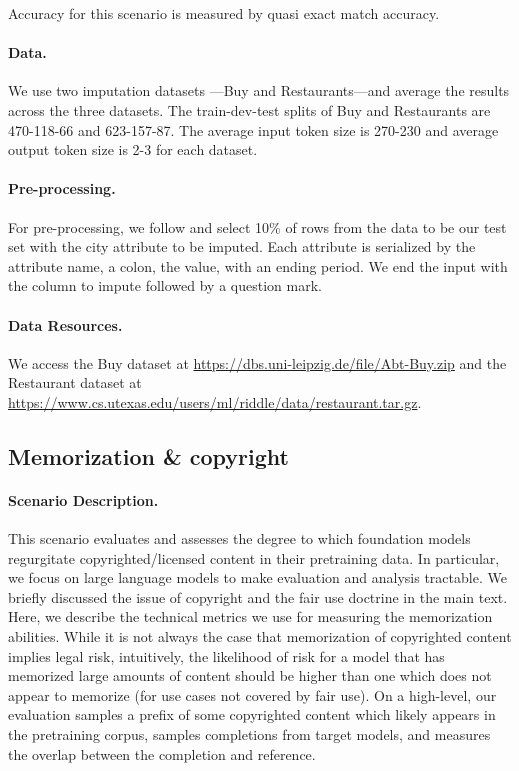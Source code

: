 Accuracy for this scenario is measured by quasi exact match accuracy.

\paragraph{Data.}
We use two imputation datasets \citep{mei2021capturing}---Buy and Restaurants---and average the results across the three datasets. The train-dev-test splits of Buy and Restaurants are 470-118-66 and 623-157-87. The average input token size is 270-230 and average output token size is 2-3 for each dataset.

\paragraph{Pre-processing.}
For pre-processing, we follow \citet{mei2021capturing} and select 10\% of rows from the data to be our test set with the city attribute to be imputed. Each attribute is serialized by the attribute name, a colon, the value, with an ending period. We end the input with the column to impute followed by a question mark.

\paragraph{Data Resources.}
We access the Buy dataset at \url{https://dbs.uni-leipzig.de/file/Abt-Buy.zip} and the Restaurant dataset at \url{https://www.cs.utexas.edu/users/ml/riddle/data/restaurant.tar.gz}.

\subsection{Memorization \& copyright}
\label{app:component-copyright}

\paragraph{Scenario Description.}
This scenario evaluates and assesses the degree to which foundation models regurgitate copyrighted/licensed content in their pretraining data.
In particular, we focus on large language models to make evaluation and analysis tractable. 
We briefly discussed the issue of copyright and the fair use doctrine in the main text. 
Here, we describe the technical metrics we use for measuring the memorization abilities. 
While it is not always the case that memorization of copyrighted content implies legal risk, intuitively, the likelihood of risk for a model that has memorized large amounts of content should be higher than one which does not appear to memorize (for use cases not covered by fair use). On a high-level, our evaluation samples a prefix of some copyrighted content which likely appears in the pretraining corpus, samples completions from target models, and measures the overlap between the completion and reference. 

